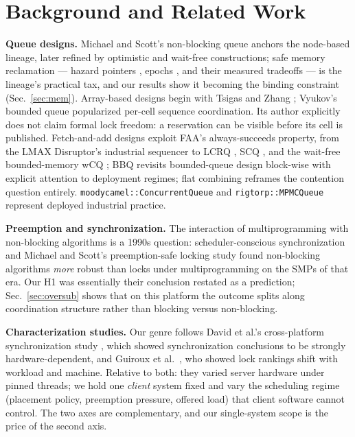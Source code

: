 \documentclass[conference]{IEEEtran}
\begin{document}
\section{Background and Related Work}
\label{sec:background}
\textbf{Queue designs.} Michael and Scott's non-blocking queue
\cite{michael1996} anchors the node-based lineage, later refined by optimistic
\cite{ladanmozes2004} and wait-free \cite{kogan2011,yang2016} constructions;
safe memory reclamation --- hazard pointers \cite{michael2004}, epochs
\cite{fraser2004}, and their measured tradeoffs \cite{hart2007} --- is the
lineage's practical tax, and our results show it becoming the binding
constraint (Sec.~\ref{sec:mem}). Array-based designs begin with Tsigas and
Zhang \cite{tsigas2001}; Vyukov's bounded queue \cite{vyukov} popularized
per-cell sequence coordination. Its author explicitly does not claim formal
lock freedom: a reservation can be visible before its cell is published.
Fetch-and-add designs exploit FAA's
always-succeeds property, from the LMAX Disruptor's industrial sequencer
\cite{thompson2011} to LCRQ \cite{morrison2013}, SCQ \cite{nikolaev2019}, and
the wait-free bounded-memory wCQ \cite{nikolaev2022wcq}; BBQ
\cite{wang2022bbq} revisits bounded-queue design block-wise with explicit
attention to deployment regimes; flat combining \cite{hendler2010} reframes
the contention question entirely. \texttt{moodycamel::ConcurrentQueue}
\cite{moodycamel} and \texttt{rigtorp::MPMCQueue} \cite{rigtorp} represent
deployed industrial practice.

\textbf{Preemption and synchronization.} The interaction of multiprogramming
with non-blocking algorithms is a 1990s question: scheduler-conscious
synchronization \cite{kontothanassis1997} and Michael and Scott's
preemption-safe locking study \cite{michael1998preemption} found non-blocking
algorithms \emph{more} robust than locks under multiprogramming on the SMPs
of that era. Our H1 was essentially their conclusion restated as a
prediction; Sec.~\ref{sec:oversub} shows that on this platform the outcome
splits along coordination structure rather than blocking versus non-blocking.

\textbf{Characterization studies.} Our genre follows David et al.'s
cross-platform synchronization study \cite{david2013}, which showed
synchronization conclusions to be strongly hardware-dependent, and Guiroux et
al.\ \cite{guiroux2016}, who showed lock rankings shift with workload and
machine. Relative to both: they varied server hardware under pinned threads;
we hold one \emph{client} system fixed and vary the scheduling regime
(placement policy, preemption pressure, offered load) that client software
cannot control. The two axes are complementary, and our single-system scope
is the price of the second axis.
\end{document}
